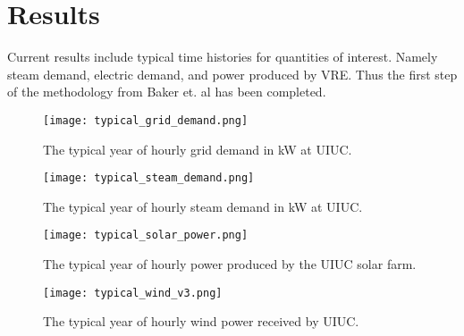 \section{Results}

Current results include typical time histories for quantities of interest. Namely steam demand, electric demand, and power produced by VRE. Thus the first step of the methodology from Baker et. al has been completed.

\begin{figure}[H]
 	\centering
 	\label{grid-demand}
 	\texttt{[image: typical\_grid\_demand.png]}
 	\caption{The typical year of hourly grid demand in kW at UIUC.}
\end{figure} 
\begin{figure}[H]
	\centering
	\label{steam-demand}
	\texttt{[image: typical\_steam\_demand.png]}
	\caption{The typical year of hourly steam demand in kW at UIUC.}
\end{figure}
\begin{figure}[H]
	\centering
	\label{solar-power}
	\texttt{[image: typical\_solar\_power.png]}
	\caption{The typical year of hourly power produced by the UIUC solar farm.}
\end{figure}
\begin{figure}[H]
	\centering
	\label{wind-power}
	\texttt{[image: typical\_wind\_v3.png]}
	\caption{The typical year of hourly wind power received by UIUC.}
\end{figure}